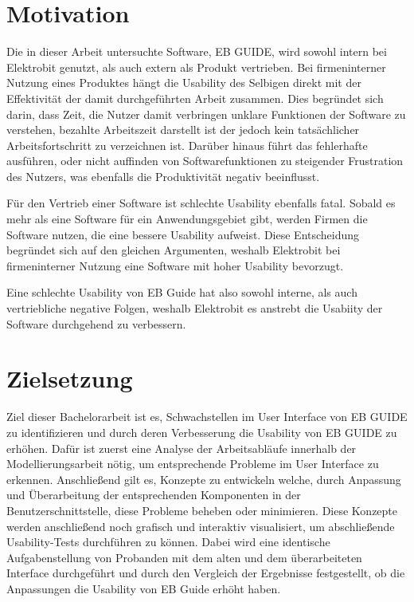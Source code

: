 \section{Motivation}
Die in dieser Arbeit untersuchte Software, EB GUIDE, wird sowohl intern bei Elektrobit genutzt, als auch extern als Produkt vertrieben.
Bei firmeninterner Nutzung eines Produktes hängt die Usability des Selbigen direkt mit der Effektivität der damit durchgeführten Arbeit zusammen.
Dies begründet sich darin, dass Zeit, die Nutzer damit verbringen unklare Funktionen der Software zu verstehen, bezahlte Arbeitszeit darstellt ist der jedoch kein tatsächlicher Arbeitsfortschritt zu verzeichnen ist.
Darüber hinaus führt das fehlerhafte ausführen, oder nicht auffinden von Softwarefunktionen zu steigender Frustration des Nutzers, was ebenfalls die Produktivität negativ beeinflusst.

Für den Vertrieb einer Software ist schlechte Usability ebenfalls fatal.
Sobald es mehr als eine Software für ein Anwendungsgebiet gibt, werden Firmen die Software nutzen, die eine bessere Usability aufweist.
Diese Entscheidung begründet sich auf den gleichen Argumenten, weshalb Elektrobit bei  firmeninterner Nutzung eine Software mit hoher Usability bevorzugt.

Eine schlechte Usability von EB Guide hat also sowohl interne, als auch vertriebliche negative Folgen, weshalb Elektrobit es anstrebt die Usabiity der Software durchgehend zu verbessern.

\section{Zielsetzung}
Ziel dieser Bachelorarbeit ist es, Schwachstellen im User Interface von EB GUIDE zu identifizieren und durch deren Verbesserung die Usability von EB GUIDE zu erhöhen.
Dafür ist zuerst eine Analyse der Arbeitsabläufe innerhalb der Modellierungsarbeit nötig, um entsprechende Probleme im User Interface zu erkennen.
Anschließend gilt es, Konzepte zu entwickeln welche, durch Anpassung und Überarbeitung der entsprechenden Komponenten in der Benutzerschnittstelle, diese Probleme beheben oder minimieren.
Diese Konzepte werden anschließend noch grafisch und interaktiv visualisiert, um abschließende Usability-Tests durchführen zu können.
Dabei wird eine identische Aufgabenstellung von Probanden mit dem alten und dem überarbeiteten Interface durchgeführt und durch den Vergleich der Ergebnisse festgestellt, ob die Anpassungen die Usability von EB Guide erhöht haben.


